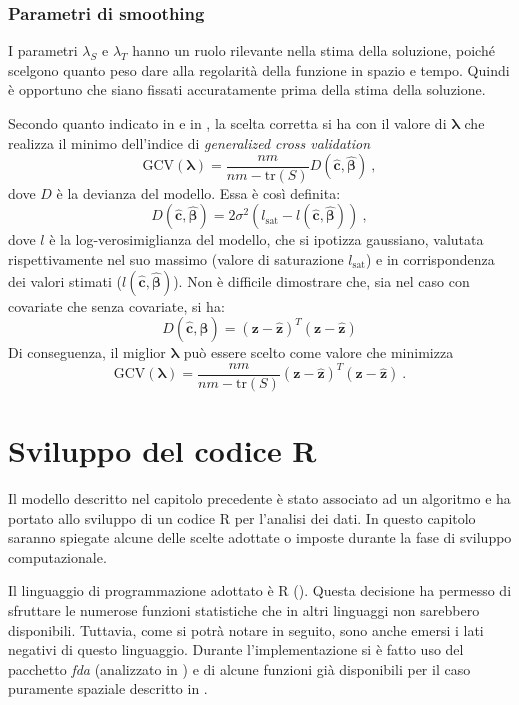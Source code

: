 \documentclass[a4paper,11pt,twoside,openright]{book}							%
\begin{document}
\subsection{Parametri di smoothing}
I parametri $\lambda_S$ e $\lambda_T$ hanno un ruolo rilevante nella stima della soluzione, poiché scelgono quanto peso dare alla regolarità della funzione in spazio e tempo. Quindi è opportuno che siano fissati accuratamente prima della stima della soluzione.

Secondo quanto indicato in \cite{art:gcv} e in \cite{art:marra}, la scelta corretta si ha con il valore di $\bm \lambda$ che realizza il minimo dell'indice di \textit{generalized cross validation}
$$
\mathrm{GCV}(\bm \lambda) =\frac{nm}{nm-\text{tr}(S)}  D(\hat  {\bm c},\hat  {\bm \beta}) \ ,
$$
dove $D$ è la devianza del modello. Essa è così definita:
$$
D(\hat  {\bm c},\hat  {\bm \beta})=2\sigma^2(l_{\mathrm{sat}}-l(\hat  {\bm c},\hat  {\bm \beta})) \ ,
$$
dove $l$ è la log-verosimiglianza del modello, che si ipotizza gaussiano, valutata rispettivamente nel suo massimo (valore di saturazione $l_{\mathrm{sat}}$) e in corrispondenza dei valori stimati ($l(\hat  {\bm c},\hat  {\bm \beta})$). Non è difficile dimostrare che, sia nel caso con covariate che senza covariate, si ha: 
$$
D(\hat  {\bm c},\hat  {\bm \beta}) = (\bm z - \hat  {\bm z})^T(\bm z - \hat  {\bm z})
$$
Di conseguenza, il miglior $\bm \lambda$ può essere scelto come valore che minimizza
\begin{equation}
\label{eq:GCV}
\mathrm{GCV}(\bm \lambda) =\frac{nm}{nm-\text{tr}(S)}  (\bm z - \hat  {\bm z})^T(\bm z - \hat  {\bm z}) \ .
\end{equation}
\newpage
\thispagestyle{empty}


\chapter{Sviluppo del codice R}
\label{cap:Codice}
Il modello descritto nel capitolo precedente è stato associato ad un algoritmo e ha portato allo sviluppo di un codice R per l'analisi dei dati. In questo capitolo saranno spiegate alcune delle scelte adottate o imposte durante la fase di sviluppo computazionale.

Il linguaggio di programmazione adottato è R (\cite{prog:R}). Questa decisione ha permesso di sfruttare le numerose funzioni statistiche che in altri linguaggi non sarebbero disponibili. Tuttavia, come si potrà notare in seguito, sono anche emersi i lati negativi di questo linguaggio. Durante l'implementazione si è fatto uso del pacchetto \textit{fda} (analizzato in \cite{package:fda}) e di alcune funzioni già disponibili per il caso puramente spaziale descritto in \cite{art:sangalli}.
\end{document}
